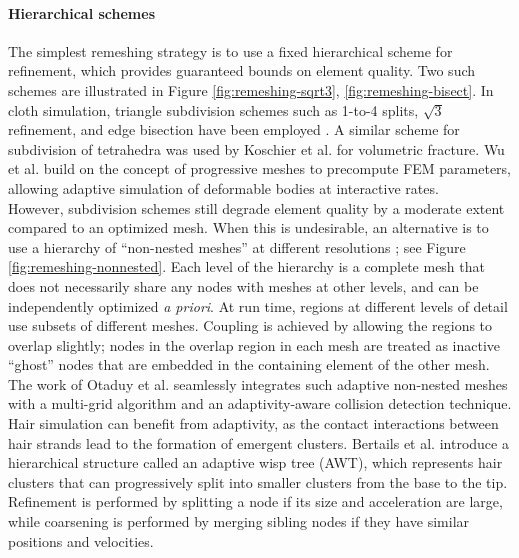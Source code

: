 \paragraph*{Hierarchical schemes} The simplest remeshing strategy is to use a fixed hierarchical scheme for refinement, which provides guaranteed bounds on element quality.
Two such schemes are illustrated in Figure \ref{fig:remeshing-sqrt3}, \ref{fig:remeshing-bisect}.
In cloth simulation, triangle subdivision schemes such as 1-to-4 splits, $\sqrt3$ refinement, and edge bisection have been employed \cite{Li2005,Simnett2009,Bender2012:adaptiveFEM}.
A similar scheme for subdivision of tetrahedra was used by Koschier et al. \cite{Koschier2014} for volumetric fracture.
Wu et al. \cite{Wu2001} build on the concept of progressive meshes \cite{Hoppe1996} to precompute FEM parameters, allowing adaptive simulation of deformable bodies at interactive rates.
\\
However, subdivision schemes still degrade element quality by a moderate extent compared to an optimized mesh.
When this is undesirable, an alternative is to use a hierarchy of ``non-nested meshes'' at different resolutions \cite{Debunne2000,Debunne2001}; see Figure \ref{fig:remeshing-nonnested}.
Each level of the hierarchy is a complete mesh that does not necessarily share any nodes with meshes at other levels, and can be independently optimized \textit{a priori}.
At run time, regions at different levels of detail use subsets of different meshes.
Coupling is achieved by allowing the regions to overlap slightly; nodes in the overlap region in each mesh are treated as inactive ``ghost'' nodes that are embedded in the containing element of the other mesh.
The work of Otaduy et al. \cite{Otaduy2007} seamlessly integrates such adaptive non-nested meshes with a multi-grid algorithm and an adaptivity-aware collision detection technique.
\\
Hair simulation can benefit from adaptivity, as the contact interactions between hair strands lead to the formation of emergent clusters.
Bertails et al. \cite{Bertails2003} introduce a hierarchical structure called an adaptive wisp tree (AWT), which represents hair clusters that can progressively split into smaller clusters from the base to the tip.
Refinement is performed by splitting a node if its size and acceleration are large, while coarsening is performed by merging sibling nodes if they have similar positions and velocities.

